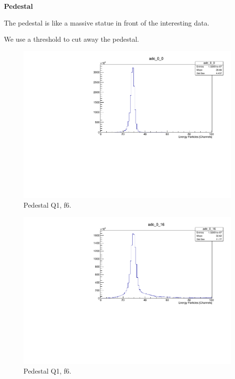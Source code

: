 \documentclass[twoside,english]{uiofysmaster/uiofysmaster}
\begin{document}
\textbf{Pedestal}

The pedestal is like a massive statue in front of the interesting data. 


We use a threshold to cut away the pedestal.

\begin{figure}[ht]
	\centering
	\includegraphics[width=\textwidth]{../Plots/plotting/Pedestal_Q1_f1.pdf}
	\caption{Pedestal Q1, f6.}
	\label{fig:Pedestal_f}
\end{figure}

\begin{figure}[ht]
	\centering
	\includegraphics[width=\textwidth]{../Plots/plotting/Pedestal_Q1_b1.pdf}
	\caption{Pedestal Q1, f6.}
	\label{fig:Pedestal_b}
\end{figure}
\end{document}
